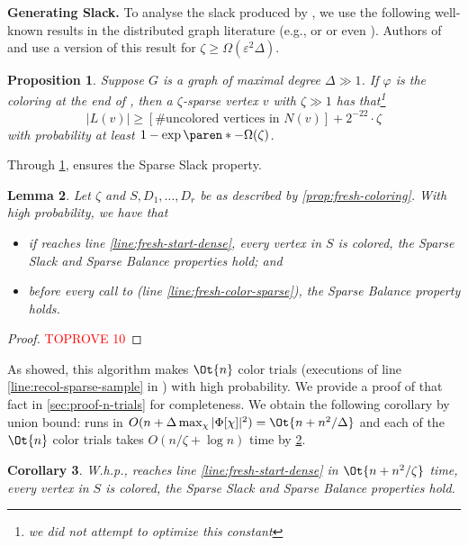 \documentclass[a4paper,english,11pt]{amsart}
\renewcommand{\paragraph}[1]{\medskip\noindent\textbf{#1}}
\newtheorem{lemma}{Lemma}[section]
\newtheorem{proposition}[lemma]{Proposition}
\newtheorem{corollary}[lemma]{Corollary}
\theoremstyle{definition}
\renewcommand{\geq}{\geqslant}
\DeclarePairedDelimiter{\paren}()
\newcommand{\eps}{\varepsilon}
\newcommand{\col}{\varphi}
\begin{document}
\paragraph{Generating Slack.}
To analyse the slack produced by \OneShotColoring, we use the following well-known results in the distributed graph literature (e.g., \cite[Lemma 3.3]{CLP20} or \cite[Lemma 6.1]{HKMT21} or even \cite{RM02}). Authors of \cite[Lemma A.1]{ACK19} and \cite{BRW24} use a version of this result for $\zeta \geq \Omega(\eps^2 \Delta)$.
\begin{proposition}
    \label{thm:slack-gen}
    Suppose $G$ is a graph of maximal degree $\Delta \gg 1$.
    If $\col$ is the coloring at the end of \OneShotColoring, then a $\zeta$-sparse vertex $v$ with $\zeta \gg 1$ has that\footnote{we did not attempt to optimize this constant}
    \[
        |L(v)|
        \geq [\#\text{uncolored vertices in $N(v)$}] + 2^{-22} \cdot \zeta
    \]
    with probability at least $1 - \exp \paren*{ - \Omega( \zeta) }$.
\end{proposition}

Through \cref{thm:slack-gen}, \OneShotColoring ensures the Sparse Slack property.



\begin{lemma}
    \label{lem:fresh-slack}
    Let $\zeta$ and $S, D_1, \ldots, D_r$ be as described by \cref{prop:fresh-coloring}.
    With high probability, we have that
    \begin{itemize}
    \item if \FreshColoring reaches line \ref{line:fresh-start-dense}, every vertex in $S$ is colored, the Sparse Slack and Sparse Balance properties hold; and
    \item before every call to \RecolorSparse (line \ref{line:fresh-color-sparse}), the Sparse Balance property holds.
    \end{itemize}
\end{lemma}

\begin{proof}\textcolor{red}{TOPROVE 10}\end{proof}

As \cite[Appendix A.1]{BRW24} showed, this algorithm makes $\Ot{n}$ color trials (executions of line \ref{line:recol-sparse-sample} in \RecolorSparse) with high probability. We provide a proof of that fact in \cref{sec:proof-n-trials} for completeness. We obtain the following corollary by union bound: \OneShotColoring runs in $O(n + \Delta\max_\chi|\Phi[\chi]|^2) = \Ot{ n + n^2 / \Delta }$ and each of the $\Ot{n}$ color trials takes $O(n/\zeta + \log n)$ time by \cref{lem:fresh-slack}.
\begin{corollary}
    \label{cor:fresh-sparse}
    W.h.p., \FreshColoring reaches line \ref{line:fresh-start-dense} in $\Ot{ n + n^2 / \zeta }$ time, every vertex in $S$ is colored, the Sparse Slack and Sparse Balance properties hold.
\end{corollary}
\end{document}
